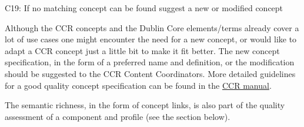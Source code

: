 \label{c19}
C19: If no matching concept can be found suggest a new or modified concept


Although the CCR concepts and the Dublin Core elements/terms already cover a lot of use cases one might encounter the need for a new concept, or would like to adapt a CCR concept just a little bit to make it fit better. The new concept specification, in the form of a preferred name and definition, or the modification should be suggested to the CCR Content Coordinators. More detailed guidelines for a good quality
concept specification can be found in the 
\href{https://www.overleaf.com/read/pxnsftbcphhb}{CCR manual}.

The semantic richness, in the form of concept links, is also part of the quality assessment of a component and profile (see the  section below).
